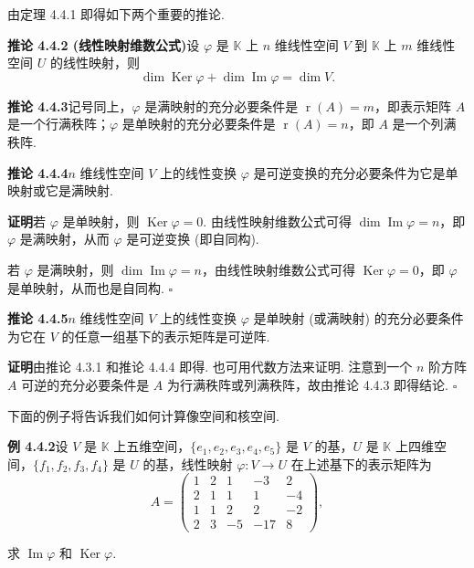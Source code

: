 \documentclass[UTF8,12pt,a4paper,fontset=fandol]{ctexart}
\begin{document}
由定理 4.4.1 即得如下两个重要的推论.

\noindent\textbf{推论 4.4.2 (线性映射维数公式)}\quad 设 $\varphi$ 是 $\mathbb{K}$ 上 $n$ 维线性空间 $V$ 到 $\mathbb{K}$ 上 $m$ 维线性空间 $U$ 的线性映射，则
\[
\dim\operatorname{Ker}\varphi+\dim\operatorname{Im}\varphi=\dim V.
\]

\noindent\textbf{推论 4.4.3}\quad 记号同上，$\varphi$ 是满映射的充分必要条件是 $\operatorname{r}(A)=m$，即表示矩阵 $A$ 是一个行满秩阵；$\varphi$ 是单映射的充分必要条件是 $\operatorname{r}(A)=n$，即 $A$ 是一个列满秩阵.

\noindent\textbf{推论 4.4.4}\quad $n$ 维线性空间 $V$ 上的线性变换 $\varphi$ 是可逆变换的充分必要条件为它是单映射或它是满映射.

\noindent\textbf{证明}\quad 若 $\varphi$ 是单映射，则 $\operatorname{Ker}\varphi=0$. 由线性映射维数公式可得 $\dim\operatorname{Im}\varphi=n$，即 $\varphi$ 是满映射，从而 $\varphi$ 是可逆变换 (即自同构).

若 $\varphi$ 是满映射，则 $\dim\operatorname{Im}\varphi=n$，由线性映射维数公式可得 $\operatorname{Ker}\varphi=0$，即 $\varphi$ 是单映射，从而也是自同构. $\square$

\noindent\textbf{推论 4.4.5}\quad $n$ 维线性空间 $V$ 上的线性变换 $\varphi$ 是单映射 (或满映射) 的充分必要条件为它在 $V$ 的任意一组基下的表示矩阵是可逆阵.

\noindent\textbf{证明}\quad 由推论 4.3.1 和推论 4.4.4 即得. 也可用代数方法来证明. 注意到一个 $n$ 阶方阵 $A$ 可逆的充分必要条件是 $A$ 为行满秩阵或列满秩阵，故由推论 4.4.3 即得结论. $\square$

下面的例子将告诉我们如何计算像空间和核空间.

\noindent\textbf{例 4.4.2}\quad 设 $V$ 是 $\mathbb{K}$ 上五维空间，$\{e_1,e_2,e_3,e_4,e_5\}$ 是 $V$ 的基，$U$ 是 $\mathbb{K}$ 上四维空间，$\{f_1,f_2,f_3,f_4\}$ 是 $U$ 的基，线性映射 $\varphi:V\to U$ 在上述基下的表示矩阵为
\[
A=
\left(\begin{array}{rrrrr}
1 & 2 & 1 & -3 & 2\\
2 & 1 & 1 & 1 & -4\\
1 & 1 & 2 & 2 & -2\\
2 & 3 & -5 & -17 & 8
\end{array}\right),
\]

求 $\operatorname{Im}\varphi$ 和 $\operatorname{Ker}\varphi$.
\end{document}
